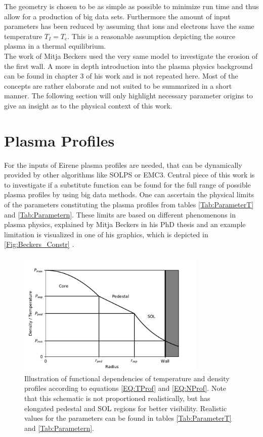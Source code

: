 		The geometry is chosen to be as simple as possible to minimize run time and thus allow for a production of big data sets. Furthermore the amount of input parameters has been reduced by assuming that ions and electrons have the same temperature $T_I =T_e$. This is a reasonable assumption depicting the source plasma in a thermal equilibrium.\\		
		The work of Mitja Beckers \cite{Beckers} used the very same model to investigate the erosion of the first wall. A more in depth introduction into the plasma physics background can be found in chapter 3 of his work and is not repeated here. Most of the concepts are rather elaborate and not suited to be summarized in a short manner. The following section will only highlight necessary parameter origins to give an insight as to the physical context of this work.
		
	\section{Plasma Profiles}
		For the inputs of Eirene plasma profiles are needed, that can be dynamically provided by other algorithms like SOLPS or EMC3. Central piece of this work is to investigate if a substitute function can be found for the full range of possible plasma profiles by using big data methods. One can ascertain the physical limits of the parameters constituting the plasma profiles from tables \ref{Tab:ParameterT} and \ref{Tab:Parametern}. These limits are based on different phenomenons in plasma physics, explained by Mitja Beckers in his PhD thesis \cite{Beckers} and an example limitation is visualized in one of his graphics, which is depicted in \ref{Fig:Beckers_Constr} .\\
		
		\begin{figure}
			\centering
			\includegraphics[width=0.8\textwidth]{./images/DensityPlot.pdf}
			\caption{Illustration of functional dependencies of temperature and density profiles according to equations \ref{EQ:TProf} and \ref{EQ:NProf}. Note that this schematic is not proportioned realistically, but has elongated pedestal and SOL regions for better visibility. Realistic values for the parameters can be found in tables \ref{Tab:ParameterT} and \ref{Tab:Parametern}.}
			\label{Fig:PlasmaProfile}
		\end{figure}
		
